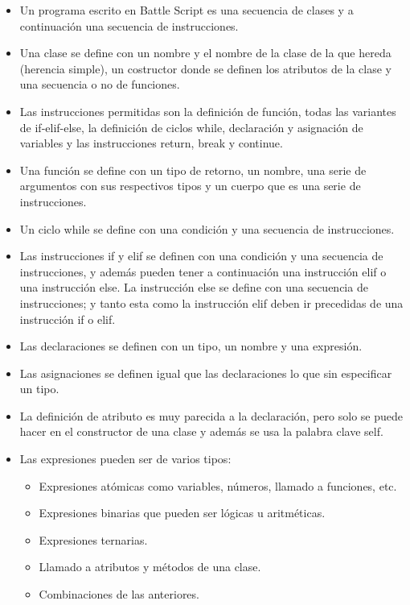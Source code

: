 \begin{itemize}
	\item Un programa escrito en Battle Script es una secuencia de clases y a continuaci\'on una secuencia de instrucciones.
	\item Una clase se define con un nombre y el nombre de la clase de la que hereda (herencia simple), un costructor donde se definen los atributos de la clase y una secuencia o no de funciones.
	\item Las instrucciones permitidas son la definici\'on de funci\'on, todas las variantes de if-elif-else, la definici\'on de ciclos while, declaraci\'on y asignaci\'on de variables y las instrucciones return, break y continue. 
	\item Una funci\'on se define con un tipo de retorno, un nombre, una serie de argumentos con sus respectivos tipos y un cuerpo que es una serie de instrucciones.
	\item Un ciclo while se define con una condici\'on y una secuencia de instrucciones.
	\item Las instrucciones if y elif se definen con una condici\'on y una secuencia de instrucciones, y adem\'as pueden tener a continuaci\'on una instrucci\'on elif o una instrucci\'on else. La instrucci\'on else se define con una secuencia de instrucciones; y tanto esta como la instrucci\'on elif deben ir precedidas de una instrucci\'on if o elif.
	\item Las declaraciones se definen con un tipo, un nombre y una expresi\'on.
	\item Las asignaciones se definen igual que las declaraciones lo que sin especificar un tipo.
	\item La definici\'on de atributo es muy parecida a la declaraci\'on, pero solo se puede hacer en el constructor de una clase y adem\'as se usa la palabra clave self.
	\item Las expresiones pueden ser de varios tipos:
	\begin{itemize}
		\item Expresiones at\'omicas como variables, n\'umeros, llamado a funciones, etc.
		\item Expresiones binarias que pueden ser l\'ogicas u aritm\'eticas.
		\item Expresiones ternarias.
		\item Llamado a atributos y m\'etodos de una clase.
		\item Combinaciones de las anteriores.
	\end{itemize}
\end{itemize}


